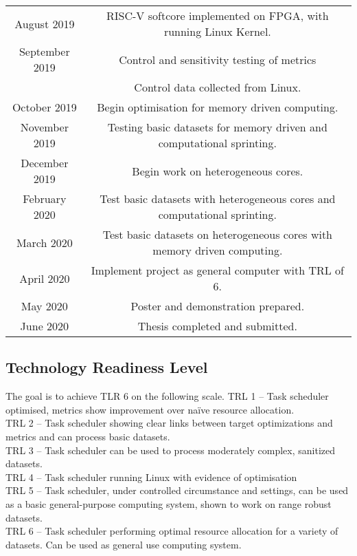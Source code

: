 		\begin{center}
		\begin{tabular}{ c c }
		August 2019 & RISC-V softcore implemented on FPGA, with running Linux Kernel.\\
		September 2019 & Control and sensitivity testing of metrics \\ & Control data collected from Linux.\\
		October 2019 & Begin optimisation for memory driven computing.\\
		November 2019 & Testing basic datasets for memory driven and computational sprinting.\\
		December 2019 & Begin work on heterogeneous cores.\\
		February 2020 & Test basic datasets with heterogeneous cores and computational sprinting.\\
		March 2020 & Test basic datasets on heterogeneous cores with memory driven computing.\\
		April 2020 & Implement project as general computer with TRL of 6.\\
		May 2020 & Poster and demonstration prepared.\\
		June 2020 & Thesis completed and submitted.\\
		\end{tabular}
		\end{center}
	
	\subsection{Technology Readiness Level}
		The goal is to achieve TLR 6 on the following scale.
		TRL 1 – Task scheduler optimised, metrics show improvement over naïve resource allocation.\\
		TRL 2 – Task scheduler showing clear links between target optimizations and metrics and can process basic datasets.\\
		TRL 3 – Task scheduler can be used to process moderately complex, sanitized datasets.\\
		TRL 4 – Task scheduler running Linux with evidence of optimisation\\
		TRL 5 – Task scheduler, under controlled circumstance and settings, can be used as a basic general-purpose computing system, shown to work on range robust datasets.\\
		TRL 6 – Task scheduler performing optimal resource allocation for a variety of datasets. Can be used as general use computing system.\\



